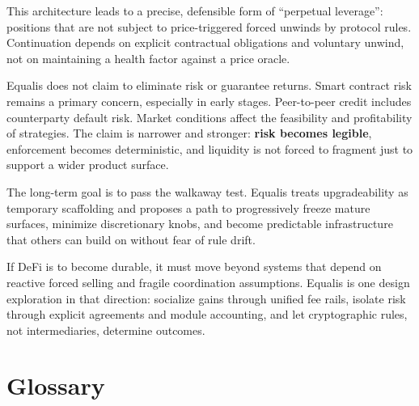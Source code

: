 \documentclass[version=preprint]{iacrcc}
\begin{document}
This architecture leads to a precise, defensible form of ``perpetual leverage'': positions that are not subject to price-triggered forced unwinds by protocol rules. Continuation depends on explicit contractual obligations and voluntary unwind, not on maintaining a health factor against a price oracle.

Equalis does not claim to eliminate risk or guarantee returns. Smart contract risk remains a primary concern, especially in early stages. Peer-to-peer credit includes counterparty default risk. Market conditions affect the feasibility and profitability of strategies. The claim is narrower and stronger: \textbf{risk becomes legible}, enforcement becomes deterministic, and liquidity is not forced to fragment just to support a wider product surface.

The long-term goal is to pass the walkaway test. Equalis treats upgradeability as temporary scaffolding and proposes a path to progressively freeze mature surfaces, minimize discretionary knobs, and become predictable infrastructure that others can build on without fear of rule drift.

If DeFi is to become durable, it must move beyond systems that depend on reactive forced selling and fragile coordination assumptions. Equalis is one design exploration in that direction: socialize gains through unified fee rails, isolate risk through explicit agreements and module accounting, and let cryptographic rules, not intermediaries, determine outcomes.


\appendix

\section{Glossary}
\end{document}
